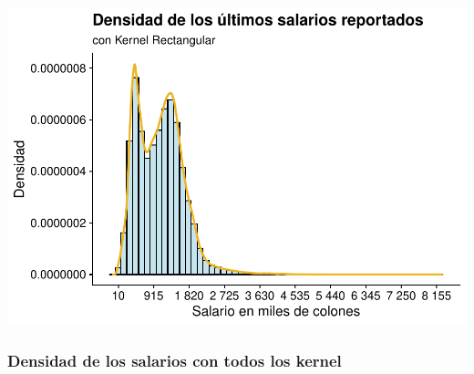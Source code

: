 \documentclass[
]{article}
\begin{document}
\includegraphics{mientras_files/figure-latex/unnamed-chunk-17-1.pdf}

\hypertarget{densidad-de-los-salarios-con-todos-los-kernel}{%
\subsubsection{Densidad de los salarios con todos los
kernel}\label{densidad-de-los-salarios-con-todos-los-kernel}}
\end{document}
